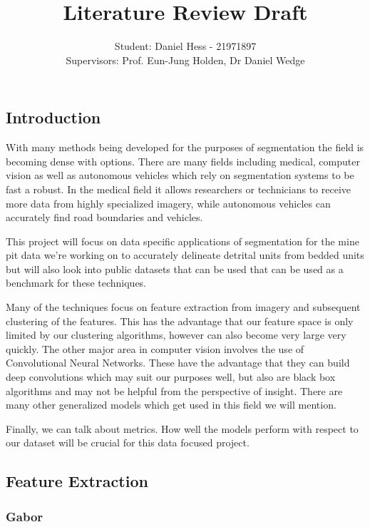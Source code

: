 \documentclass[a4]{article}
\title{Literature Review Draft}
\author{Student: Daniel Hess - 21971897\\Supervisors: Prof. Eun-Jung Holden, Dr Daniel Wedge}
\date{}
\begin{document}
\maketitle

\subsection*{Introduction}

With many methods being developed for the purposes of segmentation the field is becoming dense with options. There are many fields including medical, computer vision as well as autonomous vehicles which rely on segmentation systems to be fast a robust. In the medical field it allows researchers or technicians to receive more data from highly specialized imagery, while autonomous vehicles can accurately find road boundaries and vehicles. 

  

This project will focus on data specific applications of segmentation for the mine pit data we're working on to accurately delineate detrital units from bedded units but will also look into public datasets that can be used that can be used as a benchmark for these techniques. 

  

Many of the techniques focus on feature extraction from imagery and subsequent clustering of the features. This has the advantage that our feature space is only limited by our clustering algorithms, however can also become very large very quickly. The other major area in computer vision involves the use of Convolutional Neural Networks. These have the advantage that they can build deep convolutions which may suit our purposes well, but also are black box algorithms and may not be helpful from the perspective of insight. There are many other generalized models which get used in this field we will mention. 

  

Finally, we can talk about metrics. How well the models perform with respect to our dataset will be crucial for this data focused project. 

\subsection*{Feature Extraction}

\subsubsection*{Gabor}
\end{document}
